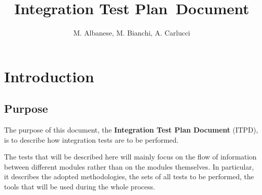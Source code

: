 \documentclass[a4paper, 12pt]{article}
\newcounter{tc}
\begin{document}
\newcommand{\code}[1]{
    \texttt{#1}
}

\newcommand{\testx}[7]{
	\stepcounter{tc}
	\subsection{Test \thetc: #1} %

	\begin{tabular}{l p{0.7\textwidth}}
    \hline
    \textbf{Test Case Identifier} & \thetc\\
    \hline
    \textbf{Test Item(s)} & \code{#2} $\rightarrow$ \code{#3}\\
    \hline
    \textbf{Input Specification} & #4\\
    \hline
    \textbf{Output Specification} & #5\\
    \hline
    \textbf{Environmental Needs} & #6\\
    \hline
    \textbf{Test Description} & #7\\
    \hline
	\end{tabular}
}

\title{Integration Test Plan Document}

\author{M. Albanese, M. Bianchi, A. Carlucci}

\maketitle
\newpage{}
\tableofcontents{}

\newpage{}

\section{Introduction}

\subsection{Purpose}
\label{sub:purpose}
The purpose of this document, the \textbf{Integration Test Plan Document} (ITPD), is to describe how integration tests are to be performed.

The tests that will be described here will mainly focus on the flow of information between different modules rather than on the modules themselves.
In particular, it describes the adopted methodologies, the sets of all tests to be performed, the tools that will be used during the whole process.
\end{document}
